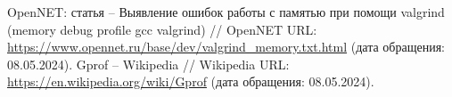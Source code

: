 \begin{thebibliography}{99}
    OpenNET: статья -- Выявление ошибок работы с памятью при помощи valgrind (memory debug profile gcc valgrind) 
    // OpenNET URL: \url{https://www.opennet.ru/base/dev/valgrind_memory.txt.html} (дата обращения: 08.05.2024).
    Gprof -- Wikipedia // Wikipedia URL: \url{https://en.wikipedia.org/wiki/Gprof} (дата обращения: 08.05.2024).
\end{thebibliography}
\pagebreak
